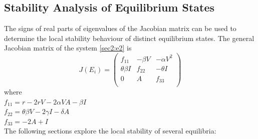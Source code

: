 \documentclass[12pt]{article}
\numberwithin{equation}{section}
\begin{document}
\subsection{Stability Analysis of Equilibrium States}
 The signs of real parts of eigenvalues of the Jacobian matrix can be used to determine the local stability behaviour of distinct equilibrium states.
The general Jacobian matrix of the system \eqref{sec2:e2} is
\begin{equation}\label{sec3:e28}
J(E_i)=
\left({\begin{matrix}
	f_{11} & -\beta V & -\alpha V^2\\
	\theta \beta I & f_{22} & -\theta I\\
	0 & A & f_{33}\\
\end{matrix}}\right)
\end{equation}
where\\
$f_{11}=r-2rV-2\alpha V A-\beta I$\\
$f_{22}=\theta \beta V - 2\gamma I - \delta A$\\
$f_{33}=-2A + I$\\
The following sections explore the local stability of several equilibria:
\end{document}

